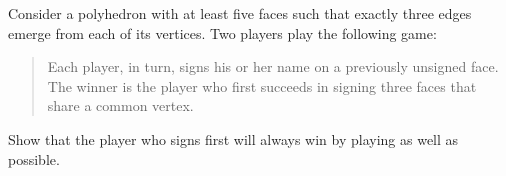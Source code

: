 Consider a polyhedron with at least five faces such that exactly three
edges emerge from each of its vertices. Two players play the following
game:
\begin{verse}
\noindent
Each player, in turn, signs his or her name on a previously
unsigned face. The winner is the player who first succeeds in
signing three faces that share a common vertex.
\end{verse}
Show that the player who signs first will always win by playing
as well as possible.
